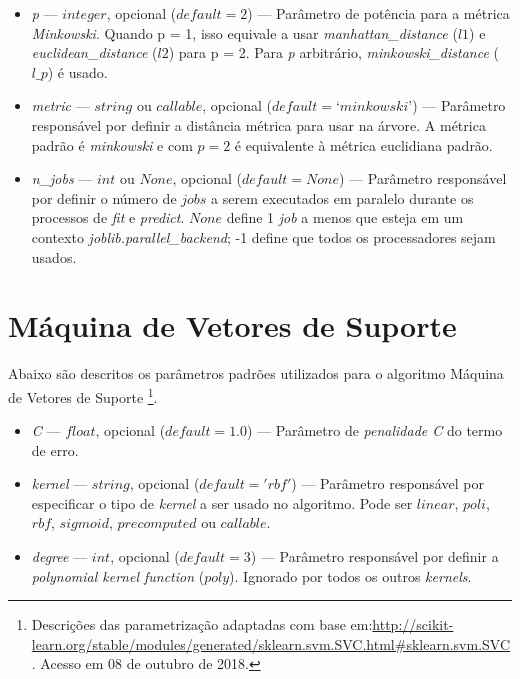 \documentclass[
	12pt,				%
	oneside,			%
	a4paper,			%
	english,			%
	brazil				%
	]{abntex2ppgsi}
\begin{document}
{{\begin{apendicesenv}
\begin{itemize}
\item \textit{p} --- $integer$, opcional ($default = 2$) --- Parâmetro de potência para a métrica \textit{Minkowski}. Quando p = 1, isso equivale a usar \textit{manhattan\_distance} ($l1$) e \textit{euclidean\_distance} ($l2$) para p = 2. Para \textit{p} arbitrário, \textit{minkowski\_distance} ($l\_p$) é usado.

\item \textit{metric} --- $string$ ou $callable$, opcional ($default = ‘minkowski’$) --- Parâmetro responsável por definir a distância métrica para usar na árvore. A métrica padrão é \textit{minkowski} e com $p = 2$ é equivalente à métrica euclidiana padrão. 

\item \textit{n\_jobs} --- $int$ ou $None$, opcional ($default = None$) --- Parâmetro responsável por definir o número de $jobs$ a serem executados em paralelo durante os processos de \textit{fit} e \textit{predict}. $None$ define 1 \textit{job} a menos que esteja em um contexto \textit{joblib.parallel\_backend}; -1 define que todos os processadores sejam usados.
\end{itemize}

\section{Máquina de Vetores de Suporte}

Abaixo são descritos os parâmetros padrões utilizados para o algoritmo Máquina de Vetores de Suporte
\footnote{Descrições das parametrização adaptadas com base em:\url{http://scikit-learn.org/stable/modules/generated/sklearn.svm.SVC.html\#sklearn.svm.SVC}. Acesso em 08 de outubro de 2018.}.

\begin{itemize}
\item \textit{C} --- $float$, opcional ($default=1.0$)
 --- Parâmetro de \textit{penalidade C} do termo de erro.
 
 \item \textit{kernel} --- $string$, opcional ($default='rbf'$) --- Parâmetro responsável por especificar o tipo de \textit{kernel} a ser usado no algoritmo. Pode ser $linear$, $poli$, $rbf$, $sigmoid$, $precomputed$ ou $callable$.

\item \textit{degree} --- $int$, opcional ($default=3$) --- Parâmetro responsável por definir a \textit{polynomial kernel function} ($poly$). Ignorado por todos os 
outros \textit{kernels}.


\end{itemize}
\end{apendicesenv}}}
\end{document}
